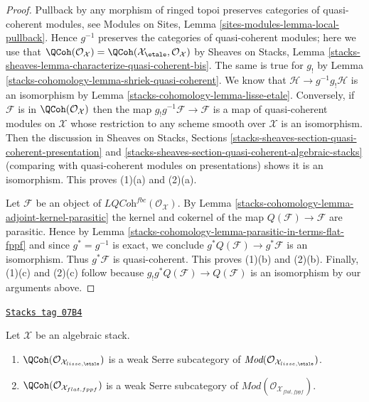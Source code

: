 \begin{proof}
Pullback by any morphism of ringed topoi preserves categories of quasi-coherent
modules, see
Modules on Sites, Lemma \ref{sites-modules-lemma-local-pullback}.
Hence $g^{-1}$ preserves the categories of quasi-coherent modules;
here we use that
$\QCoh(\mathcal{O}_\mathcal{X}) =
\QCoh(\mathcal{X}_\etale, \mathcal{O}_\mathcal{X})$
by Sheaves on Stacks, Lemma
\ref{stacks-sheaves-lemma-characterize-quasi-coherent-bis}.
The same is true for $g_!$ by
Lemma \ref{stacks-cohomology-lemma-shriek-quasi-coherent}.
We know that $\mathcal{H} \to g^{-1}g_!\mathcal{H}$ is an isomorphism by
Lemma \ref{stacks-cohomology-lemma-lisse-etale}.
Conversely, if $\mathcal{F}$ is in $\QCoh(\mathcal{O}_\mathcal{X})$
then the map $g_!g^{-1}\mathcal{F} \to \mathcal{F}$ is a map of quasi-coherent
modules on $\mathcal{X}$ whose restriction to any scheme smooth over
$\mathcal{X}$ is an isomorphism. Then the discussion in
Sheaves on Stacks, Sections
\ref{stacks-sheaves-section-quasi-coherent-presentation} and
\ref{stacks-sheaves-section-quasi-coherent-algebraic-stacks}
(comparing with quasi-coherent modules on presentations)
shows it is an isomorphism. This proves (1)(a) and (2)(a).

\medskip\noindent
Let $\mathcal{F}$ be an object of
$\textit{LQCoh}^{fbc}(\mathcal{O}_\mathcal{X})$. By
Lemma \ref{stacks-cohomology-lemma-adjoint-kernel-parasitic}
the kernel and cokernel of the map
$Q(\mathcal{F}) \to \mathcal{F}$ are parasitic. Hence by
Lemma \ref{stacks-cohomology-lemma-parasitic-in-terms-flat-fppf}
and since $g^* = g^{-1}$ is exact, we conclude
$g^*Q(\mathcal{F}) \to g^*\mathcal{F}$ is an isomorphism. Thus
$g^*\mathcal{F}$ is quasi-coherent. This proves (1)(b) and (2)(b).
Finally, (1)(c) and (2)(c) follow because
$g_!g^*Q(\mathcal{F}) \to Q(\mathcal{F})$ is an isomorphism by
our arguments above.
\end{proof}

\begin{lemma}
\label{stacks-cohomology-lemma-quasi-coherent-weak-serre}
\href{https://stacks.math.columbia.edu/tag/07B4}{\texttt{Stacks tag 07B4}}

Let $\mathcal{X}$ be an algebraic stack.
\begin{enumerate}
\item $\QCoh(\mathcal{O}_{\mathcal{X}_{lisse,\etale}})$
is a weak Serre subcategory of
$\textit{Mod}(\mathcal{O}_{\mathcal{X}_{lisse,\etale}})$.
\item $\QCoh(\mathcal{O}_{\mathcal{X}_{flat,fppf}})$
is a weak Serre subcategory of
$\textit{Mod}(\mathcal{O}_{\mathcal{X}_{flat,fppf}})$.
\end{enumerate}
\end{lemma}

